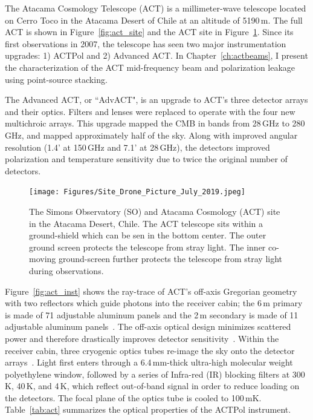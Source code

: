The Atacama Cosmology Telescope (ACT) is a millimeter-wave telescope located on Cerro Toco in the Atacama Desert of Chile at an altitude of 5190\,m.  The full ACT is shown in Figure~\ref{fig:act_site} and the ACT site in Figure~\ref{fig:act_so_site}.  Since its first observations in 2007, the telescope has seen two major instrumentation upgrades: 1) ACTPol and 2) Advanced ACT.  In Chapter~\ref{ch:actbeams}, I present the characterization of the ACT mid-frequency beam and polarization leakage using point-source stacking.

The Advanced ACT, or ``AdvACT", is an upgrade to ACT's three detector arrays and their optics.  Filters and lenses were replaced to operate with the four new multichroic arrays.  This upgrade mapped the CMB in bands from 28\,GHz to 280\,GHz, and mapped approximately half of the sky.  Along with improved angular resolution (1.4' at 150\,GHz and 7.1' at 28\,GHz), the detectors improved polarization and temperature sensitivity due to twice the original number of detectors.
\begin{figure}[t]
    \centering
    \texttt{[image: Figures/Site\_Drone\_Picture\_July\_2019.jpeg]}
    \caption{The Simons Observatory (SO) and Atacama Cosmology (ACT) site in the Atacama Desert, Chile. The ACT telescope sits within a ground-shield which can be sen in the bottom center.  The outer ground screen protects the telescope from stray light.  The inner co-moving ground-screen further protects the telescope from stray light during observations.}
    \label{fig:act_so_site}
\end{figure}

Figure~\ref{fig:act_inst} shows the ray-trace of ACT's off-axis Gregorian geometry with two reflectors which guide photons into the receiver cabin; the 6\,m primary is made of 71 adjustable aluminum panels and the 2\,m secondary is made of 11 adjustable aluminum panels~\cite{act_inst}.  The off-axis optical design minimizes scattered power and therefore drastically improves detector sensitivity~\cite{fowler_2007}.  Within the receiver cabin, three cryogenic optics tubes re-image the sky onto the detector arrays~\cite{thornton_2016}.  Light first enters through a 6.4\,mm-thick ultra-high molecular weight polyethylene window, followed by a series of Infra-red (IR) blocking filters at 300\,K, 40\,K, and 4\,K, which reflect out-of-band signal in order to reduce loading on the detectors.  The focal plane of the optics tube is cooled to 100\,mK.   Table~\ref{tab:act} summarizes the optical properties of the ACTPol instrument.


